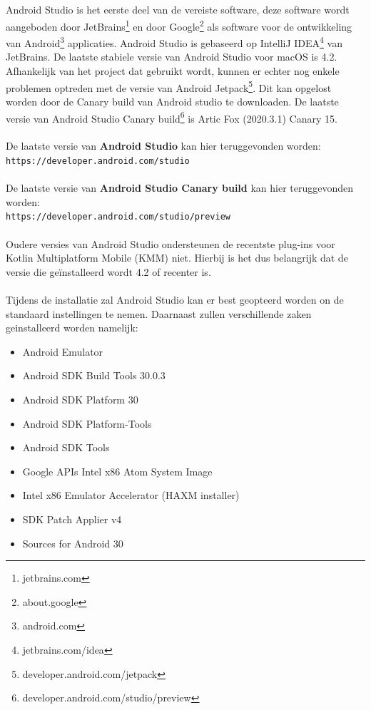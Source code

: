     \subsection{}
    \label{sec:I-AS}
    Android Studio is het eerste deel van de vereiste software, deze software wordt aangeboden door JetBrains\footnote{jetbrains.com} en door Google\footnote{about.google} als software voor de ontwikkeling van Android\footnote{android.com} applicaties. Android Studio is gebaseerd op IntelliJ IDEA\footnote{jetbrains.com/idea} van JetBrains. De laatste stabiele versie van Android Studio voor macOS is 4.2.  Afhankelijk van het project dat gebruikt wordt, kunnen er echter nog enkele problemen optreden met de versie van Android Jetpack\footnote{developer.android.com/jetpack}. Dit kan opgelost worden door de Canary build van Android studio te downloaden. De laatste versie van Android Studio Canary build\footnote{developer.android.com/studio/preview} is Artic Fox (2020.3.1) Canary 15.
    \\ \\
    De laatste versie van \textbf{Android Studio} kan hier teruggevonden worden:\\
    \verb*|https://developer.android.com/studio|
    \\ \\ 
    De laatste versie van \textbf{Android Studio Canary build} kan hier teruggevonden worden:\\
    \verb*|https://developer.android.com/studio/preview|
    \\ \\
    Oudere versies van Android Studio ondersteunen de recentste plug-ins voor Kotlin Multiplatform Mobile (KMM) niet. Hierbij is het dus belangrijk dat de versie die geïnstalleerd wordt 4.2 of recenter is.
    \\ \\ 
    Tijdens de installatie zal Android Studio kan er best geopteerd worden on de standaard instellingen te nemen. Daarnaast zullen verschillende zaken geinstalleerd worden namelijk:
    \begin{itemize}
        \item Android Emulator
        \item Android SDK Build Tools 30.0.3
        \item Android SDK Platform 30
        \item Android SDK Platform-Tools
        \item Android SDK Tools
        \item Google APIs Intel x86 Atom System Image
        \item Intel x86 Emulator Accelerator (HAXM installer)
        \item SDK Patch Applier v4
        \item Sources for Android 30
    \end{itemize}
